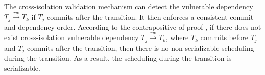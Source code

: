 {%
The cross-isolation validation mechanism can detect the vulnerable dependency $T_j \xrightarrow{rw} T_k$ if $T_j$ commits after the transition. It then enforces a consistent commit and dependency order. According to the contrapositive of proof , if there does not exist cross-isolation vulnerable dependency $T_j \xrightarrow{rw} T_k$, where $T_k$ commits before $T_j$ and $T_j$ commits after the transition, then there is no non-serializable scheduling during the transition. As a result, the scheduling during the transition is serializable. 


}



